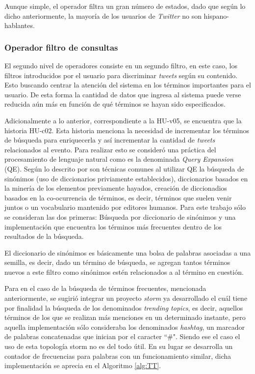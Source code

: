 Aunque simple, el operador filtra un gran número de estados, dado que según lo dicho anteriormente, la mayoría de los usuarios de \textit{Twitter} no son hispano-hablantes. 

\subsubsection*{Operador filtro de consultas}
\label{subsubsec:2op}

El segundo nivel de operadores consiste en un segundo filtro, en este caso, los filtros introducidos por el usuario para discriminar \textit{tweets} según su contenido. Esto buscando centrar la atención del sistema en los términos importantes para el usuario. De esta forma la cantidad de datos que ingresa al sistema puede verse reducida aún más en función de qué términos se hayan sido especificados.

Adicionalmente a lo anterior, correspondiente a la HU-v05, se encuentra que la historia HU-c02. Esta historia menciona la necesidad de incrementar los términos de búsqueda para enriquecerla y así incrementar la cantidad de \textit{tweets} relacionados al evento. Para realizar esto se consideró una práctica del procesamiento de lenguaje natural como es la denominada \textit{Query Expansion} (QE). Según lo descrito por \cite{IRQE} son técnicas comunes al utilizar QE la búsqueda de sinónimos (uso de diccionarios priviamente establecidos), diccionarios basados en la minería de los elementos previamente hayados, creación de diccionadios basados en la co-ocurrencia de términos, es decir, términos que suelen venir juntos o un vocabulario mantenido por editores humanos. Para este trabajo sólo se consideran las dos primeras: Búsqueda por diccionario de sinónimos y una implementación que encuentra los términos más frecuentes dentro de los resultados de la búsqueda.

El diccionario de sinónimos es básicamente una bolsa de palabras asociadas a una semilla, es decir, dado un término de búsqueda, se agregan tantos términos nuevos a este filtro como sinónimos estén relacionados a al término en cuestión.

Para en el caso de la búsqueda de términos frecuentes, mencionada anteriormente, se sugirió integrar un proyecto \textit{storm} ya desarrollado el cuál tiene por finalidad la búsqueda de los denominados \textit{trending topics}, es decir, aquellos términos de los que se realizan más menciones en un determinado instante, pero aquella implementación sólo consideraba los denominados \textit{hashtag}, un marcador de palabras concatenadas que inician por el caracter ``\#". Siendo ese el caso el uso de esta topología storm no es del todo útil. En su lugar se desarrolla un contador de frecuencias para palabras con un funcionamiento similar, dicha implementación se aprecia en el Algoritmo \ref{alg:TT}.\\

